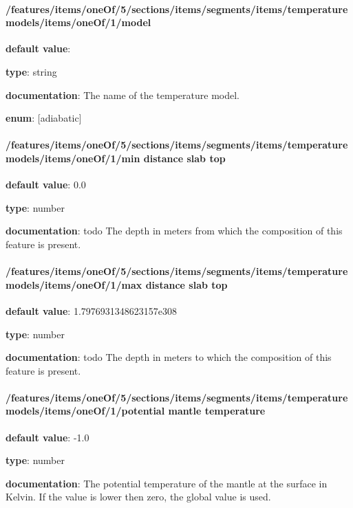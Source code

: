 \paragraph{/features/items/oneOf/5/sections/items/segments/items/temperature models/items/oneOf/1/model} \begin{itemized}
\item {\bf default value}: 
\item {\bf type}: string
\item {\bf documentation}: The name of the temperature model.
\item {\bf enum}: [adiabatic]\end{itemized}\paragraph{/features/items/oneOf/5/sections/items/segments/items/temperature models/items/oneOf/1/min distance slab top} \begin{itemized}
\item {\bf default value}: 0.0
\item {\bf type}: number
\item {\bf documentation}: todo The depth in meters from which the composition of this feature is present.
\end{itemized}\paragraph{/features/items/oneOf/5/sections/items/segments/items/temperature models/items/oneOf/1/max distance slab top} \begin{itemized}
\item {\bf default value}: 1.7976931348623157e308
\item {\bf type}: number
\item {\bf documentation}: todo The depth in meters to which the composition of this feature is present.
\end{itemized}\paragraph{/features/items/oneOf/5/sections/items/segments/items/temperature models/items/oneOf/1/potential mantle temperature} \begin{itemized}
\item {\bf default value}: -1.0
\item {\bf type}: number
\item {\bf documentation}: The potential temperature of the mantle at the surface in Kelvin. If the value is lower then zero, the global value is used.

\end{itemized}
